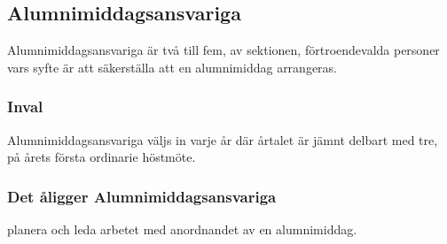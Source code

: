 \subsection{Alumnimiddagsansvariga}
Alumnimiddagsansvariga är två till fem, av sektionen, förtroendevalda personer vars syfte är att säkerställa att en alumnimiddag arrangeras.

\subsubsection{Inval}
Alumnimiddagsansvariga väljs in varje år där årtalet är jämnt delbart med tre, på årets första ordinarie höstmöte.  

\subsubsection{Det åligger Alumnimiddagsansvariga}
\begin{att}
  \item planera och leda arbetet med anordnandet av en alumnimiddag.
\end{att}